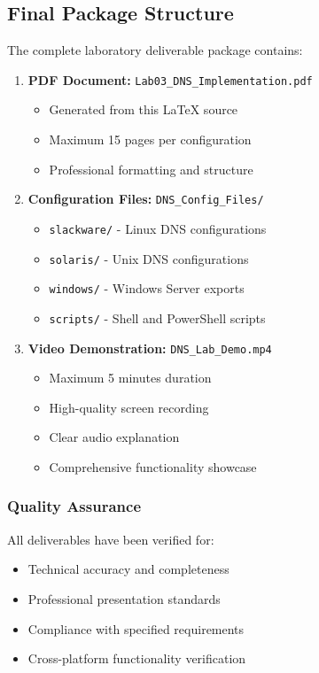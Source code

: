 \documentclass[12pt,a4paper]{article}
\begin{document}
\subsection{Final Package Structure}\label{subsec:package-structure}

The complete laboratory deliverable package contains:

\begin{enumerate}
    \item \textbf{PDF Document:} \texttt{Lab03\_DNS\_Implementation.pdf}
    \begin{itemize}
        \item Generated from this LaTeX source
        \item Maximum 15 pages per configuration
        \item Professional formatting and structure
    \end{itemize}
    
    \item \textbf{Configuration Files:} \texttt{DNS\_Config\_Files/}
    \begin{itemize}
        \item \texttt{slackware/} - Linux DNS configurations
        \item \texttt{solaris/} - Unix DNS configurations  
        \item \texttt{windows/} - Windows Server exports
        \item \texttt{scripts/} - Shell and PowerShell scripts
    \end{itemize}
    
    \item \textbf{Video Demonstration:} \texttt{DNS\_Lab\_Demo.mp4}
    \begin{itemize}
        \item Maximum 5 minutes duration
        \item High-quality screen recording
        \item Clear audio explanation
        \item Comprehensive functionality showcase
    \end{itemize}
\end{enumerate}

\subsubsection{Quality Assurance}
All deliverables have been verified for:
\begin{itemize}
    \item Technical accuracy and completeness
    \item Professional presentation standards
    \item Compliance with specified requirements
    \item Cross-platform functionality verification
\end{itemize}
\end{document}

